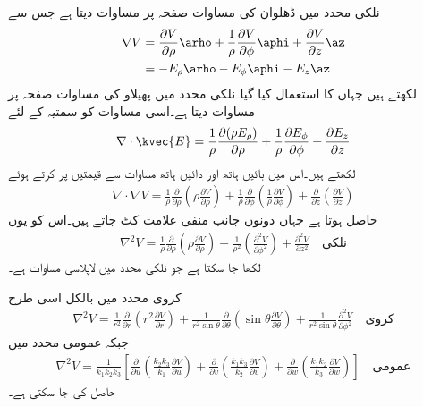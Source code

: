 نلکی محدد میں ڈھلوان کی مساوات صفحہ  پر مساوات  دیتا ہے جس سے 
\begin{gather}
\begin{aligned}\label{مساوات_لاپلاس_نلکی_پھیلاو_الف}
\nabla V &= \frac{\partial V}{\partial \rho} \arho+\frac{1}{\rho}\frac{\partial V}{\partial \phi}  \aphi+\frac{\partial V}{\partial z}\az\\
&=-E_\rho \arho-E_\phi \aphi-E_z \az 
\end{aligned}
\end{gather}
لکھتے  ہیں جہاں  کا استعمال کیا گیا۔نلکی محدد میں پھیلاو کی مساوات صفحہ  پر مساوات  دیتا ہے۔اسی مساوات کو سمتیہ  کے لئے
 \begin{align*}
\nabla \cdot \kvec{E}=\frac{1}{\rho}\frac{\partial (\rho E_{\rho})}{\partial \rho}+\frac{1}{\rho}\frac{\partial E_{\phi}}{\partial \phi}  +  \frac{\partial E_{z}}{\partial z}
\end{align*}
لکھتے ہیں۔اس میں بائیں ہاتھ   اور دائیں ہاتھ مساوات  سے قیمتیں پر کرتے ہوئے
\begin{align*}
\nabla \cdot \nabla V=\frac{1}{\rho}\frac{\partial }{\partial \rho}\left(\rho \frac{\partial V}{\partial \rho}\right)
+\frac{1}{\rho}\frac{\partial }{\partial \phi}\left(\frac{1}{\rho}\frac{\partial V}{\partial \phi}  \right) 
+  \frac{\partial}{\partial z} \left(\frac{\partial V}{\partial z} \right)
\end{align*}
حاصل ہوتا ہے جہاں دونوں جانب منفی علامت کٹ جاتے ہیں۔اس کو یوں
\begin{align}
\nabla^2 V=\frac{1}{\rho}\frac{\partial }{\partial \rho}\left(\rho \frac{\partial V}{\partial \rho}\right)
+\frac{1}{\rho^2}\left(\frac{\partial^2 V}{\partial \phi^2}  \right) 
+  \frac{\partial^2 V}{\partial z^2}\quad {\textrm{نلکی}}
\end{align}
 لکھا جا سکتا ہے جو نلکی محدد میں لاپلاسی مساوات ہے۔

کروی محدد میں بالکل اسی طرح
\begin{align}\label{مساوات_لاپلاس_کروی_لاپلاسی}
\nabla^2 V=\frac{1}{r^2} \frac{\partial}{\partial r} \left(r^2\frac{\partial V}{\partial r} \right)+\frac{1}{r^2 \sin \theta} \frac{\partial}{\partial \theta} \left(\sin \theta \frac{\partial V}{\partial \theta}  \right)+\frac{1}{r^2 \sin \theta}\frac{\partial^2 V}{\partial \phi^2} \quad {\textrm{کروی}}
\end{align}
جبکہ عمومی محدد میں
\begin{align}\label{مساوات_لاپلاس_عمومی_لاپلاسی}
\nabla^2 V=\frac{1}{k_1 k_2 k_3}\left[\frac{\partial}{\partial u}\left(\frac{k_2 k_3}{k_1}\frac{\partial V}{\partial u} \right)+\frac{\partial}{\partial v}\left(\frac{k_1 k_3}{k_2}\frac{\partial V}{\partial v} \right) +\frac{\partial}{\partial w}\left(\frac{k_1 k_2}{k_3}\frac{\partial V}{\partial w} \right)\right] \quad{\textrm{عمومی}}
\end{align}
حاصل کی جا سکتی ہے۔

